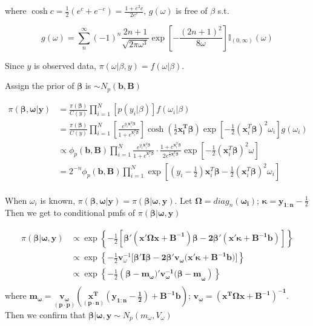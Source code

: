 \documentclass[12pt]{article}
\begin{document}
where \(\cosh{c}=\frac12(e^c+e^{-c})=\frac{1+e^2c}{2e^{c}}\),
\(g(\omega)\) is free of \(\beta\) s.t.

\[g(\omega)=\sum_n^\infty(-1)^n\frac{2n+1}{\sqrt{2\pi\omega^3}}\exp[-\frac{(2n+1)^2}{8\omega}]\mathbb{I}_{(0,\infty)}(\omega)\]

Since \(y\) is observed data, \(\pi(\omega|\beta,y)=f(\omega|\beta)\).

Assign the prior of \(\boldsymbol{\beta}\) is \(\sim N_p(\mathbf{b,B})\)

\[\begin{aligned} 
\pi(\boldsymbol{\beta,\omega|y})&= \frac{\pi(\boldsymbol{\beta})}{C(y)}\prod_{i=1}^{N}[p(y_i|\beta)]f(\omega_i|\beta)\\
&= \frac{\pi(\boldsymbol{\beta})}{C(y)}\prod_{i=1}^{N}\left[\frac{e^{y_i\mathbf{x}_i^T\boldsymbol{\beta}}}{1+e^{\mathbf{x}_i^T\boldsymbol{\beta}}}\right]\cosh{(\frac12\boldsymbol{x_i^T\beta})}\exp\left[-\frac12(\mathbf{x}_i^T\boldsymbol{\beta})^2\omega_i\right]g(\omega_i)\\
&\propto\phi_p(\mathbf{b,B})\prod_{i=1}^{N}\frac{e^{y_i\mathbf{x}_i^T\boldsymbol{\beta}}}{1+e^{\mathbf{x}_i^T\boldsymbol{\beta}}}\cdot\frac{1+e^{\mathbf{x}_i^T\boldsymbol{\beta}}}{2e^{\frac12\mathbf{x}_i^T\boldsymbol{\beta}}}\exp\left[-\frac12(\mathbf{x}_i^T\boldsymbol{\beta})^2\omega\right]\\
&=2^{-n}\phi_p(\mathbf{b,B})\prod_{i=1}^{N}\exp\left[(y_i-\frac12)\mathbf{x}_i^T\boldsymbol{\beta}-\frac12(\mathbf{x}_i^T\boldsymbol{\beta})^2\omega_i\right]\\
\end{aligned}\]

When \(\omega_i\) is known,
\(\pi(\boldsymbol{\beta,\omega|y})=\pi(\boldsymbol{\beta|\omega,y})\).
Let \(\boldsymbol{\Omega}=diag_n(\mathbf{\omega_i})\);
\(\boldsymbol{\kappa}=\mathbf{y_{1:n}}-\frac12\) Then we get to
conditional pmfs of \(\pi(\boldsymbol{\beta|\omega,y})\)

\[\begin{aligned} 
\pi(\boldsymbol{\beta|\omega,y})&\propto\exp\left\{-\frac12\left[\boldsymbol{\beta'(\mathbf{x'\Omega x+B}^{-1})\beta-2\beta'(\mathbf{x'\kappa+B^{-1}b})}\right]\right\}\\
&\propto\exp\left\{-\frac12\mathbf{v}_\omega^{-1}[\boldsymbol{\beta'\mathbf{I}\beta-2\beta'\mathbf{v_\omega(x'\kappa+B^{-1}b})]}\right\}\\
&\propto\exp\left\{-\frac12\boldsymbol{(\beta-\mathbf{m_\omega)'v_\omega^{-1}(\beta-m}_\omega)}\right\}\\
\end{aligned}\] where
\(\mathbf{m_\omega=\underset{(p\cdot p)}{v_\omega}(\underset{(p\cdot n)}{x^T}(\mathbf{y_{1:n}}-\frac12)+B^{-1}b)}\);
\(\mathbf{v_\omega=(x^T\Omega x+B^{-1})^{-1}}\). Then we confirm that
\(\boldsymbol{\beta|\omega,y}\sim N_p(m_\omega,V_\omega)\)
\end{document}
